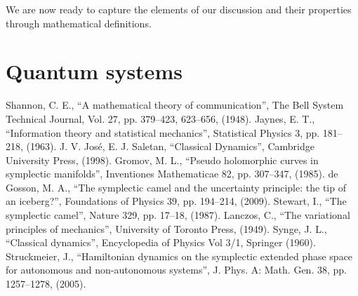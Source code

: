 \documentclass[aps,pra,10pt,twocolumn,floatfix,nofootinbib]{revtex4-1}
\theoremstyle{definition}
\begin{document}
We are now ready to capture the elements of our discussion and their properties through mathematical definitions.


\section{Quantum systems}


\begin{thebibliography}{0}

 Shannon, C. E., ``A mathematical theory of communication'', The Bell System Technical Journal, Vol. 27, pp. 379--423, 623--656, (1948).
 Jaynes, E. T., ``Information theory and statistical mechanics'', Statistical Physics 3, pp. 181--218, (1963).
 J. V. Jos\'{e}, E. J. Saletan, ``Classical Dynamics'', Cambridge University Press, (1998).
 Gromov, M. L., ``Pseudo holomorphic curves in symplectic manifolds'', Inventiones Mathematicae 82, pp. 307--347, (1985).
 de Gosson, M. A., ``The symplectic camel and the uncertainty principle: the tip of an iceberg?'', Foundations of Physics 39, pp. 194--214, (2009).
 Stewart, I., ``The symplectic camel'', Nature 329, pp. 17--18, (1987).
 Lanczos, C., ``The variational principles of mechanics'', University of Toronto Press, (1949).
 Synge, J. L., ``Classical dynamics'', Encyclopedia of Physics Vol 3/1, Springer (1960).
 Struckmeier, J., ``Hamiltonian dynamics on the symplectic extended phase space for autonomous and non-autonomous systems'', J. Phys. A: Math. Gen. 38, pp. 1257--1278, (2005).

\end{thebibliography}
\end{document}
